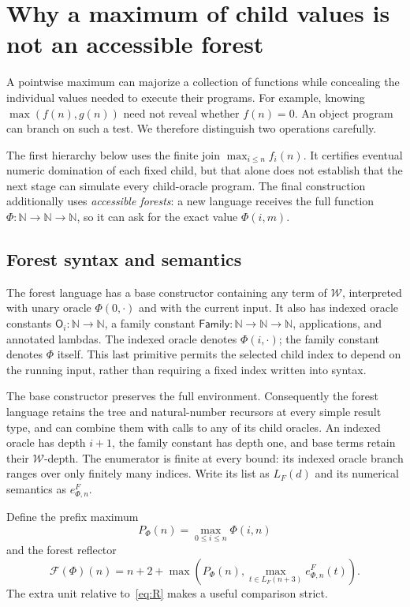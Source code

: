 \documentclass[11pt,a4paper]{article}
\theoremstyle{definition}
\newcommand{\N}{\mathbb N}
\newcommand{\F}{\mathcal F}
\begin{document}
\section{Why a maximum of child values is not an accessible forest}
\label{sec:forest}

A pointwise maximum can majorize a collection of functions while concealing
the individual values needed to execute their programs. For example, knowing
\(\max(f(n),g(n))\) need not reveal whether \(f(n)=0\). An object program can
branch on such a test. We therefore distinguish two operations carefully.

The first hierarchy below uses the finite join
\(\max_{i\le n}f_i(n)\). It certifies eventual numeric domination of each
fixed child, but that alone does not establish that the next stage can
simulate every child-oracle program. The final construction additionally
uses \emph{accessible forests}: a new language receives the full function
\(\Phi:\N\to\N\to\N\), so it can ask for the exact value \(\Phi(i,m)\).

\subsection{Forest syntax and semantics}

The forest language has a base constructor containing any term of
\(\mathcal W\), interpreted with unary oracle \(\Phi(0,\cdot)\) and with the
current input. It also has indexed oracle constants
\(\mathsf O_i:\N\to\N\), a family constant
\(\mathsf{Family}:\N\to\N\to\N\), applications, and annotated lambdas. The
indexed oracle denotes \(\Phi(i,\cdot)\); the family constant denotes \(\Phi\)
itself. This last primitive permits the selected child index to depend on
the running input, rather than requiring a fixed index written into syntax.

The base constructor preserves the full environment. Consequently the
forest language retains the tree and natural-number recursors at every
simple result type, and can combine them with calls to any of its child
oracles. An indexed oracle has depth \(i+1\), the family constant has depth
one, and base terms retain their \(\mathcal W\)-depth. The enumerator is finite
at every bound: its indexed oracle branch ranges over only finitely many
indices. Write its list as \(L_F(d)\) and its numerical semantics as
\(e^F_{\Phi,n}\).

Define the prefix maximum
\[
 P_\Phi(n)=\max_{0\le i\le n}\Phi(i,n)
\]
and the forest reflector
\begin{equation}
 \F(\Phi)(n)=n+2+
      \max\left(P_\Phi(n),
                \max_{t\in L_F(n+3)}e^F_{\Phi,n}(t)\right).
 \label{eq:F}
\end{equation}
The extra unit relative to~\eqref{eq:R} makes a useful comparison strict.
\end{document}
